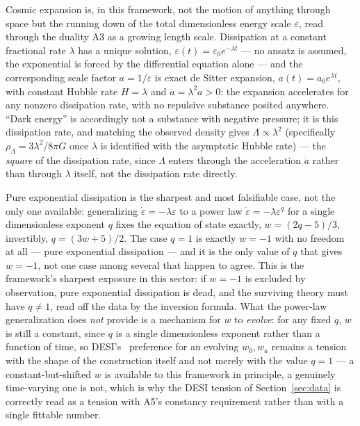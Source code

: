 \documentclass[pdflatex,sn-mathphys-num]{sn-jnl}
\theoremstyle{thmstyleone}
\theoremstyle{thmstylethree}
\theoremstyle{thmstyletwo}
\begin{document}
Cosmic expansion is, in this framework, not the motion of anything
through space but the running down of the total dimensionless energy
scale $\varepsilon$, read through the duality A3 as a growing length
scale. Dissipation at a constant fractional rate $\lambda$ has a unique
solution, $\varepsilon(t)=\varepsilon_0e^{-\lambda t}$ — no ansatz is
assumed, the exponential is forced by the differential equation alone —
and the corresponding scale factor $a=1/\varepsilon$ is exact de Sitter
expansion, $a(t)=a_0e^{\lambda t}$, with constant Hubble rate $H=\lambda$
and $\ddot a=\lambda^2a>0$: the expansion accelerates for any nonzero
dissipation rate, with no repulsive substance posited anywhere.
``Dark energy'' is accordingly not a substance with negative pressure;
it is this dissipation rate, and matching the observed density gives
$\Lambda \propto \lambda^2$ (specifically $\rho_\Lambda = 3\lambda^2/8\pi G$
once $\lambda$ is identified with the asymptotic Hubble rate) — the
\emph{square} of the dissipation rate, since $\Lambda$ enters through the
acceleration $\ddot a$ rather than through $\lambda$ itself, not the
dissipation rate directly.

Pure exponential dissipation is the sharpest and most falsifiable case,
not the only one available: generalizing $\dot\varepsilon=-\lambda\varepsilon$
to a power law $\dot\varepsilon=-\lambda\varepsilon^q$ for a single
dimensionless exponent $q$ fixes the equation of state exactly,
$w=(2q-5)/3$, invertibly, $q=(3w+5)/2$. The case $q=1$ is exactly
$w=-1$ with no freedom at all — pure exponential dissipation — and it is
the only value of $q$ that gives $w=-1$, not one case among several that
happen to agree. This is the framework's sharpest exposure in this
sector: if $w=-1$ is excluded by observation, pure exponential
dissipation is dead, and the surviving theory must have $q\neq1$, read
off the data by the inversion formula. What the power-law generalization
does \emph{not} provide is a mechanism for $w$ to \emph{evolve}: for any
fixed $q$, $w$ is still a constant, since $q$ is a single dimensionless
exponent rather than a function of time, so DESI's~\cite{DESIDR2}
preference for an
evolving $w_0,w_a$ remains a tension with the shape of the construction
itself and not merely with the value $q=1$ — a constant-but-shifted $w$
is available to this framework in principle, a genuinely time-varying
one is not, which is why the DESI tension of Section~\ref{sec:data} is
correctly read as a tension with A5's constancy requirement rather than
with a single fittable number.
\end{document}
